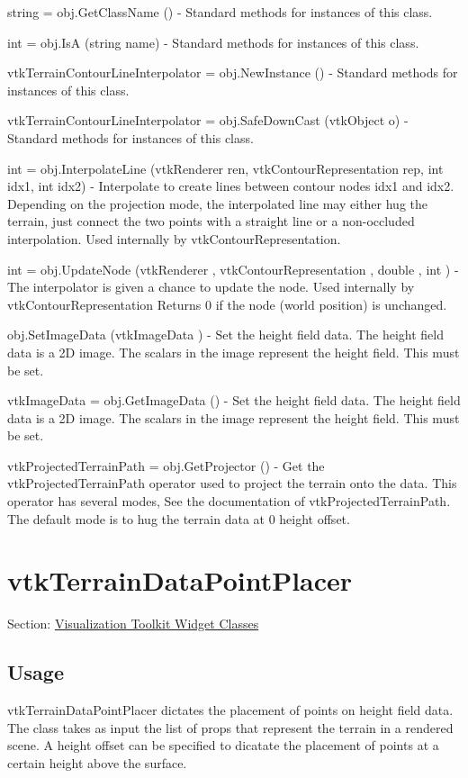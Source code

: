 \begin{DoxyItemize}
\item {\ttfamily string = obj.\-Get\-Class\-Name ()} -\/ Standard methods for instances of this class.  
\item {\ttfamily int = obj.\-Is\-A (string name)} -\/ Standard methods for instances of this class.  
\item {\ttfamily vtk\-Terrain\-Contour\-Line\-Interpolator = obj.\-New\-Instance ()} -\/ Standard methods for instances of this class.  
\item {\ttfamily vtk\-Terrain\-Contour\-Line\-Interpolator = obj.\-Safe\-Down\-Cast (vtk\-Object o)} -\/ Standard methods for instances of this class.  
\item {\ttfamily int = obj.\-Interpolate\-Line (vtk\-Renderer ren, vtk\-Contour\-Representation rep, int idx1, int idx2)} -\/ Interpolate to create lines between contour nodes idx1 and idx2. Depending on the projection mode, the interpolated line may either hug the terrain, just connect the two points with a straight line or a non-\/occluded interpolation. Used internally by vtk\-Contour\-Representation.  
\item {\ttfamily int = obj.\-Update\-Node (vtk\-Renderer , vtk\-Contour\-Representation , double , int )} -\/ The interpolator is given a chance to update the node. Used internally by vtk\-Contour\-Representation Returns 0 if the node (world position) is unchanged.  
\item {\ttfamily obj.\-Set\-Image\-Data (vtk\-Image\-Data )} -\/ Set the height field data. The height field data is a 2\-D image. The scalars in the image represent the height field. This must be set.  
\item {\ttfamily vtk\-Image\-Data = obj.\-Get\-Image\-Data ()} -\/ Set the height field data. The height field data is a 2\-D image. The scalars in the image represent the height field. This must be set.  
\item {\ttfamily vtk\-Projected\-Terrain\-Path = obj.\-Get\-Projector ()} -\/ Get the vtk\-Projected\-Terrain\-Path operator used to project the terrain onto the data. This operator has several modes, See the documentation of vtk\-Projected\-Terrain\-Path. The default mode is to hug the terrain data at 0 height offset.  
\end{DoxyItemize}\hypertarget{vtkwidgets_vtkterraindatapointplacer}{}\section{vtk\-Terrain\-Data\-Point\-Placer}\label{vtkwidgets_vtkterraindatapointplacer}
Section\-: \hyperlink{sec_vtkwidgets}{Visualization Toolkit Widget Classes} \hypertarget{vtkwidgets_vtkxyplotwidget_Usage}{}\subsection{Usage}\label{vtkwidgets_vtkxyplotwidget_Usage}
vtk\-Terrain\-Data\-Point\-Placer dictates the placement of points on height field data. The class takes as input the list of props that represent the terrain in a rendered scene. A height offset can be specified to dicatate the placement of points at a certain height above the surface.

